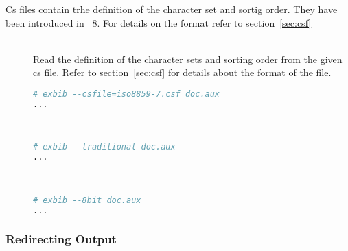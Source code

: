 Cs files contain trhe definition of the character set and sortig
order. They have been introduced in \BibTeX~8.
For details on the format refer to section~\ref{sec:csf}

\begin{description}
\item[ ]\ \\
  Read the definition of the character sets and sorting order from the
  given cs file. Refer to section~\ref{sec:csf} for details about the
  format of the file.
\begin{lstlisting}[language=sh]
# exbib --csfile=iso8859-7.csf doc.aux
...
\end{lstlisting}

\item[]
\item[]\ \\
  \INCOMPLETE
\begin{lstlisting}[language=sh]
# exbib --traditional doc.aux
...
\end{lstlisting}

\item[]
\item[]\ \\
  \INCOMPLETE
\begin{lstlisting}[language=sh]
# exbib --8bit doc.aux
...
\end{lstlisting}
\end{description}

\subsubsection{Redirecting Output}

